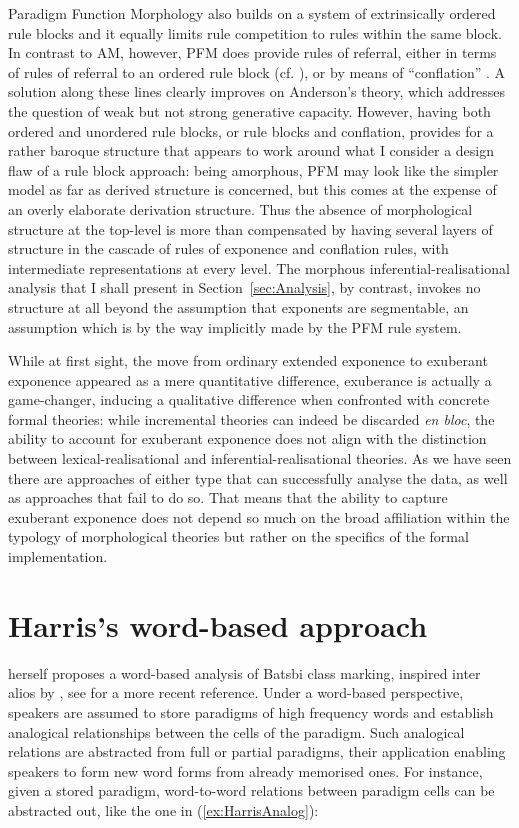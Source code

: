 \documentclass[output=paper]{langsci/langscibook}
\begin{document}
Paradigm Function Morphology also builds on a system of extrinsically
ordered rule blocks and it equally limits rule competition to rules
within the same block. In contrast to AM, however, PFM does provide
rules of referral, either in terms of rules of referral to an ordered
rule block (cf. \citealt{Stump93}), or by means of ``conflation''
\citep{Stump17}. A solution along these lines clearly improves on
Anderson's theory, which addresses the question of weak but not strong
generative capacity. However, having both ordered and unordered rule
blocks, or rule blocks and conflation, provides for a rather baroque
structure that appears to work around what I consider a design flaw of
a rule block approach: being amorphous, PFM may look like the simpler
model as far as derived structure is concerned, but this comes at the
expense of an overly elaborate derivation structure.  Thus the absence
of morphological structure at the top-level is more than compensated
by having several layers of structure in the cascade of rules of
exponence and conflation rules, with intermediate representations at
every level. The morphous inferential-realisational analysis that I
shall present in Section~\ref{sec:Analysis}, by contrast, invokes no
structure at all beyond the assumption that exponents are segmentable,
an assumption which is by the way implicitly made by the PFM rule
system.


\bigskip\noindent While at first sight, the move from ordinary
extended exponence to exuberant exponence appeared as a mere
quantitative difference, exuberance is actually a game-changer,
inducing a qualitative difference when confronted with concrete formal
theories: while incremental theories can indeed be discarded
\textit{en bloc}, the ability to account for exuberant exponence does
not align with the distinction between lexical-realisational and
inferential-realisational theories. As we have seen there are
approaches of either type that can successfully analyse the data, as
well as approaches that fail to do so. That means that the ability to
capture exuberant exponence does not depend so much on the broad
affiliation within the typology of morphological theories but rather
on the specifics of the formal implementation.

\section{Harris's word-based approach}
\citet{Harris09} herself proposes a word-based analysis of Batsbi
class marking, inspired inter alios by \citet{Blevins06}, see
\citet{Blevins14} for a more recent reference.  Under a word-based
perspective, speakers are assumed to store paradigms of high frequency
words and establish analogical relationships between the cells of the
paradigm. Such analogical relations are abstracted from full or
partial paradigms, their application enabling speakers to form new
word forms from already memorised ones. For instance, given a stored
paradigm, word-to-word relations between paradigm cells can be
abstracted out, like the one in (\ref{ex:HarrisAnalog}):
\end{document}
